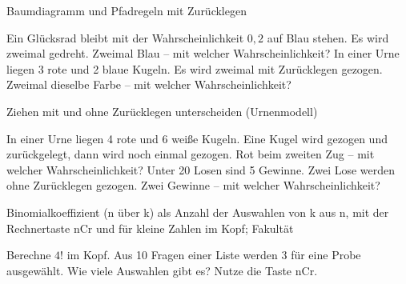 \setcounter{aufgabe}{0}

\begin{aufgabe}{Baumdiagramm und Pfadregeln mit Zurücklegen}
\begin{teile}
\teil Ein Glücksrad bleibt mit der Wahrscheinlichkeit $0{,}2$ auf Blau stehen. Es wird zweimal gedreht. Zweimal Blau – mit welcher Wahrscheinlichkeit? \leerfeld
\teil In einer Urne liegen 3 rote und 2 blaue Kugeln. Es wird zweimal mit Zurücklegen gezogen. Zweimal dieselbe Farbe – mit welcher Wahrscheinlichkeit? \leerfeld
\end{teile}
\end{aufgabe}

\begin{aufgabe}{Ziehen mit und ohne Zurücklegen unterscheiden (Urnenmodell)}
\begin{teile}
\teil In einer Urne liegen 4 rote und 6 weiße Kugeln. Eine Kugel wird gezogen und zurückgelegt, dann wird noch einmal gezogen. Rot beim zweiten Zug – mit welcher Wahrscheinlichkeit? \leerfeld
\teil Unter 20 Losen sind 5 Gewinne. Zwei Lose werden ohne Zurücklegen gezogen. Zwei Gewinne – mit welcher Wahrscheinlichkeit? \leerfeld
\end{teile}
\end{aufgabe}

\begin{aufgabe}{Binomialkoeffizient (n über k) als Anzahl der Auswahlen von k aus n, mit der Rechnertaste nCr und für kleine Zahlen im Kopf; Fakultät}
\begin{teile}
\teil Berechne $4!$ im Kopf. \leerfeld
\teil Aus 10 Fragen einer Liste werden 3 für eine Probe ausgewählt. Wie viele Auswahlen gibt es? Nutze die Taste nCr. \leerfeld
\end{teile}
\end{aufgabe}

